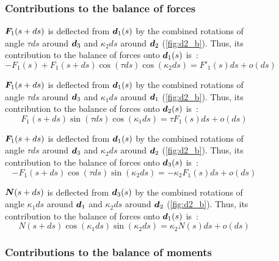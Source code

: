 \begin{figure}[p]
	\begin{fullpage}
	\subsubsection{Contributions to the balance of forces}
	\vspace{10pt}

	$\boldsymbol{F}_1(s+ds)$ is deflected from $\boldsymbol{d}_1(s)$ by the combined rotations of angle $\tau ds$ around $\boldsymbol{d}_3$ and $\kappa_2 ds$ around $\boldsymbol{d}_2$ (\cref{fig:d2_b}). Thus, its contribution to the balance of forces onto $\boldsymbol{d}_1(s)$ is~:
	\begin{equation*}
		-F_1(s) + F_1(s+ds) \cos(\tau ds) \cos(\kappa_2 ds) = F'_1 (s) ds + o(ds)
	\end{equation*}

	$\boldsymbol{F}_1(s+ds)$ is deflected from $\boldsymbol{d}_1(s)$ by the combined rotations of angle $\tau ds$ around $\boldsymbol{d}_3$ and $\kappa_1 ds$ around $\boldsymbol{d}_1$ (\cref{fig:d2_b}). Thus, its contribution to the balance of forces onto $\boldsymbol{d}_2(s)$ is~:
	\begin{equation*}
		F_1(s+ds) \sin(\tau ds) \cos(\kappa_1 ds) = \tau F_1 (s) ds + o(ds)
	\end{equation*}

	$\boldsymbol{F}_1(s+ds)$ is deflected from $\boldsymbol{d}_1(s)$ by the combined rotations of angle $\tau ds$ around $\boldsymbol{d}_3$ and $\kappa_2 ds$ around $\boldsymbol{d}_2$ (\cref{fig:d2_b}). Thus, its contribution to the balance of forces onto $\boldsymbol{d}_3(s)$ is~:
	\begin{equation*}
		-F_1(s+ds) \cos(\tau ds) \sin(\kappa_2 ds) = - \kappa_2 F_1(s) ds + o(ds)
	\end{equation*}

	$\boldsymbol{N}(s+ds)$ is deflected from $\boldsymbol{d}_3(s)$ by the combined rotations of angle $\kappa_1 ds$ around $\boldsymbol{d}_1$ and $\kappa_2 ds$ around $\boldsymbol{d}_2$ (\cref{fig:d2_b}). Thus, its contribution to the balance of forces onto $\boldsymbol{d}_1(s)$ is~:
	\begin{equation*}
		N(s+ds) \cos(\kappa_1 ds) \sin(\kappa_2 ds) = \kappa_2 N(s) ds + o(ds)
	\end{equation*}
	\vspace{10pt}

	\subsubsection{Contributions to the balance of moments}
	\vspace{10pt}


\end{fullpage}
\end{figure}
